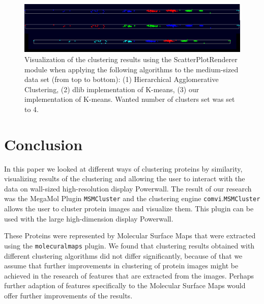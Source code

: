 \documentclass[journal]{vgtc}       %
\begin{document}

\begin{figure}[t]
	\begin{center}
		\includegraphics[width= \linewidth]{plotMedium.png}
	\end{center}
	\caption{\label{fig:plot} Visualization of the clustering results using the ScatterPlotRenderer module when applying the following algorithms to the medium-sized data set (from top to bottom): (1) Hierarchical Agglomerative Clustering, (2) dlib implementation of K-means, (3) our implementation of K-means. Wanted number of clusters set was set to 4.}
\end{figure}


\section{Conclusion}
In this paper we looked at different ways of clustering proteins by similarity, visualizing results of the clustering and allowing the user to interact with the data on wall-sized high-resolution display Powerwall. The result of our research was the  MegaMol Plugin \verb|MSMCluster| and the clustering engine \verb|comvi|.\verb|MSMCluster| allows the user to cluster  protein images and visualize them. This plugin can be used with the large high-dimension display Powerwall. 

These Proteins were represented by Molecular Surface Maps that were extracted using the \verb|molecuralmaps| plugin.
We found that clustering results obtained with different clustering algorithms did not differ significantly, because of that we assume that further improvements in clustering of protein images might be achieved in the research of features that are extracted from the images. Perhaps further adaption of features specifically to the Molecular Surface Maps would offer further improvements of the results. 
\end{document}
